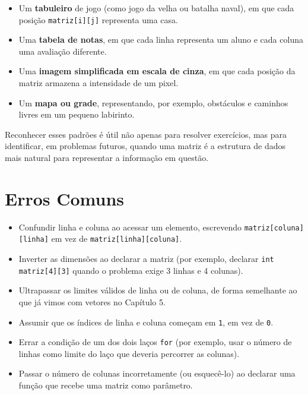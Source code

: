 \documentclass[12pt,a4paper,oneside]{extreport}
\begin{document}
\begin{itemize}
    \item Um \textbf{tabuleiro} de jogo (como jogo da velha ou batalha naval), em que cada posição \texttt{matriz[i][j]} representa uma casa.
    \item Uma \textbf{tabela de notas}, em que cada linha representa um aluno e cada coluna uma avaliação diferente.
    \item Uma \textbf{imagem simplificada em escala de cinza}, em que cada posição da matriz armazena a intensidade de um pixel.
    \item Um \textbf{mapa ou grade}, representando, por exemplo, obstáculos e caminhos livres em um pequeno labirinto.
\end{itemize}

Reconhecer esses padrões é útil não apenas para resolver exercícios, mas para identificar, em problemas futuros, quando uma matriz é a estrutura de dados mais natural para representar a informação em questão.

\section{Erros Comuns}
\label{sec:matrizes-erros}

\begin{itemize}
    \item Confundir linha e coluna ao acessar um elemento, escrevendo \texttt{matriz[coluna][linha]} em vez de \texttt{matriz[linha][coluna]}.
    \item Inverter as dimensões ao declarar a matriz (por exemplo, declarar \texttt{int matriz[4][3]} quando o problema exige 3 linhas e 4 colunas).
    \item Ultrapassar os limites válidos de linha ou de coluna, de forma semelhante ao que já vimos com vetores no Capítulo 5.
    \item Assumir que os índices de linha e coluna começam em \texttt{1}, em vez de \texttt{0}.
    \item Errar a condição de um dos dois laços \texttt{for} (por exemplo, usar o número de linhas como limite do laço que deveria percorrer as colunas).
    \item Passar o número de colunas incorretamente (ou esquecê-lo) ao declarar uma função que recebe uma matriz como parâmetro.
\end{itemize}
\end{document}
